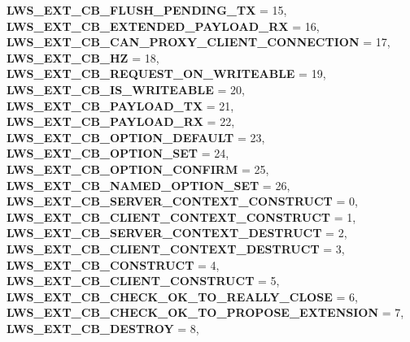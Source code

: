 \begin{DoxyCompactItemize}
{\bfseries L\+W\+S\+\_\+\+E\+X\+T\+\_\+\+C\+B\+\_\+\+F\+L\+U\+S\+H\+\_\+\+P\+E\+N\+D\+I\+N\+G\+\_\+\+TX} = 15, 
{\bfseries L\+W\+S\+\_\+\+E\+X\+T\+\_\+\+C\+B\+\_\+\+E\+X\+T\+E\+N\+D\+E\+D\+\_\+\+P\+A\+Y\+L\+O\+A\+D\+\_\+\+RX} = 16, 
\newline
{\bfseries L\+W\+S\+\_\+\+E\+X\+T\+\_\+\+C\+B\+\_\+\+C\+A\+N\+\_\+\+P\+R\+O\+X\+Y\+\_\+\+C\+L\+I\+E\+N\+T\+\_\+\+C\+O\+N\+N\+E\+C\+T\+I\+ON} = 17, 
{\bfseries L\+W\+S\+\_\+\+E\+X\+T\+\_\+\+C\+B\+\_\+HZ} = 18, 
{\bfseries L\+W\+S\+\_\+\+E\+X\+T\+\_\+\+C\+B\+\_\+\+R\+E\+Q\+U\+E\+S\+T\+\_\+\+O\+N\+\_\+\+W\+R\+I\+T\+E\+A\+B\+LE} = 19, 
{\bfseries L\+W\+S\+\_\+\+E\+X\+T\+\_\+\+C\+B\+\_\+\+I\+S\+\_\+\+W\+R\+I\+T\+E\+A\+B\+LE} = 20, 
\newline
{\bfseries L\+W\+S\+\_\+\+E\+X\+T\+\_\+\+C\+B\+\_\+\+P\+A\+Y\+L\+O\+A\+D\+\_\+\+TX} = 21, 
{\bfseries L\+W\+S\+\_\+\+E\+X\+T\+\_\+\+C\+B\+\_\+\+P\+A\+Y\+L\+O\+A\+D\+\_\+\+RX} = 22, 
{\bfseries L\+W\+S\+\_\+\+E\+X\+T\+\_\+\+C\+B\+\_\+\+O\+P\+T\+I\+O\+N\+\_\+\+D\+E\+F\+A\+U\+LT} = 23, 
{\bfseries L\+W\+S\+\_\+\+E\+X\+T\+\_\+\+C\+B\+\_\+\+O\+P\+T\+I\+O\+N\+\_\+\+S\+ET} = 24, 
\newline
{\bfseries L\+W\+S\+\_\+\+E\+X\+T\+\_\+\+C\+B\+\_\+\+O\+P\+T\+I\+O\+N\+\_\+\+C\+O\+N\+F\+I\+RM} = 25, 
{\bfseries L\+W\+S\+\_\+\+E\+X\+T\+\_\+\+C\+B\+\_\+\+N\+A\+M\+E\+D\+\_\+\+O\+P\+T\+I\+O\+N\+\_\+\+S\+ET} = 26, 
{\bfseries L\+W\+S\+\_\+\+E\+X\+T\+\_\+\+C\+B\+\_\+\+S\+E\+R\+V\+E\+R\+\_\+\+C\+O\+N\+T\+E\+X\+T\+\_\+\+C\+O\+N\+S\+T\+R\+U\+CT} = 0, 
{\bfseries L\+W\+S\+\_\+\+E\+X\+T\+\_\+\+C\+B\+\_\+\+C\+L\+I\+E\+N\+T\+\_\+\+C\+O\+N\+T\+E\+X\+T\+\_\+\+C\+O\+N\+S\+T\+R\+U\+CT} = 1, 
\newline
{\bfseries L\+W\+S\+\_\+\+E\+X\+T\+\_\+\+C\+B\+\_\+\+S\+E\+R\+V\+E\+R\+\_\+\+C\+O\+N\+T\+E\+X\+T\+\_\+\+D\+E\+S\+T\+R\+U\+CT} = 2, 
{\bfseries L\+W\+S\+\_\+\+E\+X\+T\+\_\+\+C\+B\+\_\+\+C\+L\+I\+E\+N\+T\+\_\+\+C\+O\+N\+T\+E\+X\+T\+\_\+\+D\+E\+S\+T\+R\+U\+CT} = 3, 
{\bfseries L\+W\+S\+\_\+\+E\+X\+T\+\_\+\+C\+B\+\_\+\+C\+O\+N\+S\+T\+R\+U\+CT} = 4, 
{\bfseries L\+W\+S\+\_\+\+E\+X\+T\+\_\+\+C\+B\+\_\+\+C\+L\+I\+E\+N\+T\+\_\+\+C\+O\+N\+S\+T\+R\+U\+CT} = 5, 
\newline
{\bfseries L\+W\+S\+\_\+\+E\+X\+T\+\_\+\+C\+B\+\_\+\+C\+H\+E\+C\+K\+\_\+\+O\+K\+\_\+\+T\+O\+\_\+\+R\+E\+A\+L\+L\+Y\+\_\+\+C\+L\+O\+SE} = 6, 
{\bfseries L\+W\+S\+\_\+\+E\+X\+T\+\_\+\+C\+B\+\_\+\+C\+H\+E\+C\+K\+\_\+\+O\+K\+\_\+\+T\+O\+\_\+\+P\+R\+O\+P\+O\+S\+E\+\_\+\+E\+X\+T\+E\+N\+S\+I\+ON} = 7, 
{\bfseries L\+W\+S\+\_\+\+E\+X\+T\+\_\+\+C\+B\+\_\+\+D\+E\+S\+T\+R\+OY} = 8, 

\end{DoxyCompactItemize}
